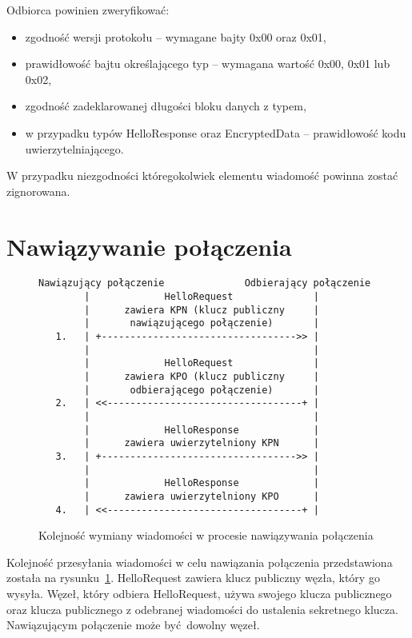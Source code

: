 Odbiorca powinien zweryfikować:

\begin{itemize}
\item zgodność wersji protokołu -- wymagane bajty 0x00 oraz 0x01,
\item prawidłowość bajtu określającego typ -- wymagana wartość 0x00, 0x01 lub 0x02,
\item zgodność zadeklarowanej długości bloku danych z typem,
\item w przypadku typów HelloResponse oraz EncryptedData -- prawidłowość kodu uwierzytelniającego.
\end{itemize}

W przypadku niezgodności któregokolwiek elementu wiadomość powinna zostać zignorowana.

\section{Nawiązywanie połączenia}

\begin{figure}[h]
\centering
\begin{BVerbatim}
Nawiązujący połączenie              Odbierający połączenie
        |             HelloRequest              |
        |      zawiera KPN (klucz publiczny     |
        |       nawiązującego połączenie)       |
   1.   | +---------------------------------->> |
        |                                       |
        |             HelloRequest              |
        |      zawiera KPO (klucz publiczny     |
        |       odbierającego połączenie)       |
   2.   | <<----------------------------------+ |
        |                                       |
        |             HelloResponse             |
        |      zawiera uwierzytelniony KPN      |
   3.   | +---------------------------------->> |
        |                                       |
        |             HelloResponse             |
        |      zawiera uwierzytelniony KPO      |
   4.   | <<----------------------------------+ |
\end{BVerbatim}
\caption{Kolejność wymiany wiadomości w procesie nawiązywania połączenia}
\label{fig:handshake}
\end{figure}

Kolejność przesyłania wiadomości w celu nawiązania połączenia przedstawiona została na rysunku~\ref{fig:handshake}. HelloRequest zawiera klucz publiczny węzła, który go wysyła. Węzeł, który odbiera HelloRequest, używa swojego klucza publicznego oraz klucza publicznego z odebranej wiadomości do ustalenia sekretnego klucza. Nawiązującym połączenie może być dowolny węzeł.

